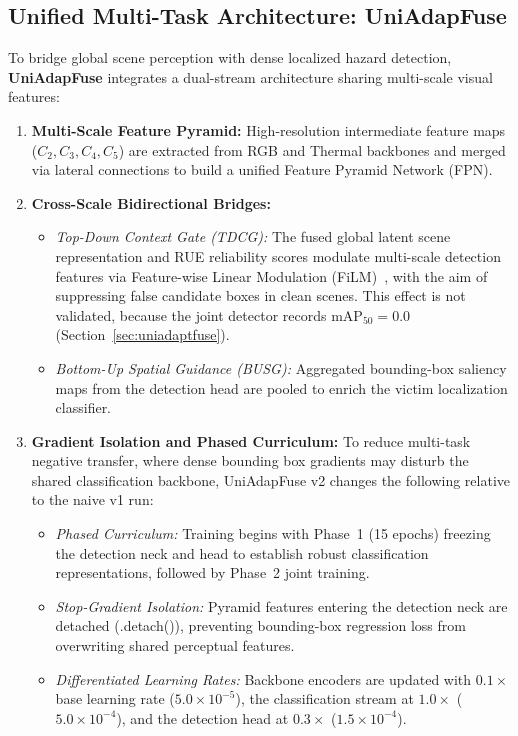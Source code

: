 \subsection{Unified Multi-Task Architecture: UniAdapFuse}
\label{sec:uniadaptfuse_arch}

To bridge global scene perception with dense localized hazard detection, \textbf{UniAdapFuse} integrates a dual-stream architecture sharing multi-scale visual features:
\begin{enumerate}
    \item \textbf{Multi-Scale Feature Pyramid:} High-resolution intermediate feature maps ($C_2, C_3, C_4, C_5$) are extracted from RGB and Thermal backbones and merged via lateral connections to build a unified Feature Pyramid Network (FPN).
    \item \textbf{Cross-Scale Bidirectional Bridges:}
    \begin{itemize}
        \item \textit{Top-Down Context Gate (TDCG):} The fused global latent scene representation and RUE reliability scores modulate multi-scale detection features via Feature-wise Linear Modulation (FiLM)~\cite{perez2018film}, with the aim of suppressing false candidate boxes in clean scenes. This effect is not validated, because the joint detector records $\mathrm{mAP}_{50}=0.0$ (Section~\ref{sec:uniadaptfuse}).
        \item \textit{Bottom-Up Spatial Guidance (BUSG):} Aggregated bounding-box saliency maps from the detection head are pooled to enrich the victim localization classifier.
    \end{itemize}
    \item \textbf{Gradient Isolation and Phased Curriculum:}
    To reduce multi-task negative transfer, where dense bounding box gradients may disturb the shared classification backbone, UniAdapFuse v2 changes the following relative to the naive v1 run:
    \begin{itemize}
        \item \textit{Phased Curriculum:} Training begins with Phase~1 (15 epochs) freezing the detection neck and head to establish robust classification representations, followed by Phase~2 joint training.
        \item \textit{Stop-Gradient Isolation:} Pyramid features entering the detection neck are detached (.detach()), preventing bounding-box regression loss from overwriting shared perceptual features.
        \item \textit{Differentiated Learning Rates:} Backbone encoders are updated with $0.1\times$ base learning rate ($5.0 \times 10^{-5}$), the classification stream at $1.0\times$ ($5.0 \times 10^{-4}$), and the detection head at $0.3\times$ ($1.5 \times 10^{-4}$).

\end{itemize}
\end{enumerate}

